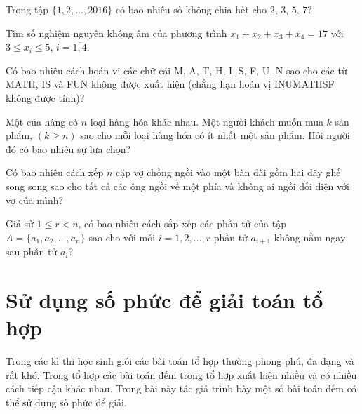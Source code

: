 \begin{bt}
 Trong tập $\{1, 2, \ldots, 2016\}$ có bao nhiêu số không chia hết cho $2$, $3$, $5$, $7$?
\end{bt}

\begin{bt}
 Tìm số nghiệm nguyên không âm của phương trình $x_1 + x_2 + x_3 + x_4 = 17$ với $3\le x_i \le 5$, $i=\overline{1,4}$.
\end{bt}

\begin{bt}
 Có bao nhiêu cách hoán vị các chữ cái M, A, T, H, I, S, F, U, N sao cho các từ MATH, IS và FUN không được xuất hiện (chẳng hạn hoán vị INUMATHSF không được tính)?
\end{bt}

\begin{bt}
 Một cửa hàng có $n$ loại hàng hóa khác nhau. Một người khách muốn mua $k$ sản phẩm, $(k\ge n)$ sao cho mỗi loại hàng hóa có ít nhất một sản phẩm. Hỏi người đó có bao nhiêu sự lựa chọn?
\end{bt}

\begin{bt}
 Có bao nhiêu cách xếp $n$ cặp vợ chồng ngồi vào một bàn dài gồm hai dãy ghế song song sao cho tất cả các ông ngồi về một phía và không ai ngồi đối diện với vợ của mình?
\end{bt}

\begin{bt}
 Giả sử $1\le r <n$, có bao nhiêu cách sắp xếp các phần tử của tập $A = \{a_1, a_2, \ldots, a_n\}$ sao cho với mỗi $i=1,2,\ldots, r$ phần tử $a_{i+1}$ không nằm ngay sau phần tử $a_i$?
\end{bt}

\section{Sử dụng số phức để giải toán tổ hợp}
\setcounter{bt}{0}
Trong các kì thi học sinh giỏi các bài toán tổ hợp thường phong phú, đa dạng và rất khó. Trong tổ hợp các bài toán  đếm trong tổ hợp xuất hiện nhiều và có nhiều cách tiếp cận khác nhau. Trong bài này tác giả trình bày một số bài toán đếm có thể sử dụng số phức để giải.
